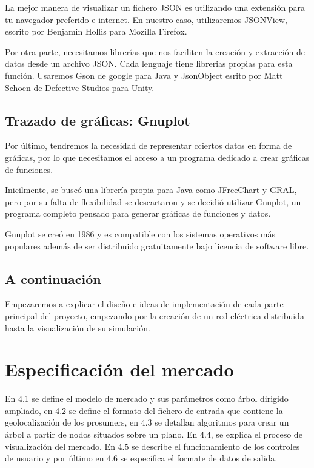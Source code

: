 \documentclass[12pt,a4paper,openright,oneside]{article}
\numberwithin{equation}{section}
\theoremstyle{definition}
\begin{document}
La mejor manera de visualizar un fichero JSON es utilizando una extensión para tu navegador preferido e internet. En nuestro caso, utilizaremos JSONView, escrito por Benjamin Hollis para Mozilla Firefox.

Por otra parte, necesitamos librerías que nos faciliten la creación y extracción de datos desde un archivo JSON. Cada lenguaje tiene librerias propias para esta función. Usaremos Gson de google para Java y JsonObject esrito por Matt Schoen de Defective Studios para Unity.

\subsection{Trazado de gráficas: Gnuplot}
Por último, tendremos la necesidad de representar cciertos datos en forma de gráficas, por lo que necesitamos el acceso a un programa dedicado a crear gráficas de funciones.

Inicilmente, se buscó una librería propia para Java como JFreeChart y GRAL, pero por su falta de flexibilidad se descartaron y se decidió utilizar Gnuplot, un programa completo pensado para generar gráficas de funciones y datos.

Gnuplot se creó en 1986 y es compatible con los sistemas operativos más populares además de ser distribuido gratuitamente bajo licencia de software libre.

\subsection{A continuación}
Empezaremos a explicar el diseño e ideas de implementación de cada parte principal del proyecto, empezando por la creación de un red eléctrica distribuida hasta la visualización de su simulación.

\newpage




\section{Especificación del mercado}

En 4.1 se define el modelo de mercado y sus parámetros como árbol dirigido ampliado, en 4.2 se define el formato del fichero de entrada que contiene la geolocalización de los prosumers, en 4.3 se detallan algoritmos para crear un árbol a partir de nodos situados sobre un plano. En 4.4, se explica el proceso de visualización del mercado. En 4.5 se describe el funcionamiento de los controles de usuario y por último en 4.6 se especifica el formate de datos de salida.
\end{document}

